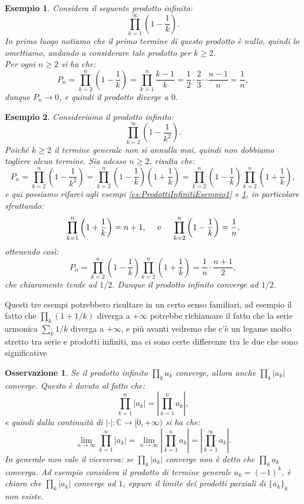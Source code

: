 \documentclass[11pt]{book}
\theoremstyle{Definizione}
\theoremstyle{TeoremaProposizioneLemmaCorollarioCongettura}
\theoremstyle{OsservazioneNotaEsempio}
\newtheorem{myobs}{Osservazione}[section]
\newtheorem{myes}{Esempio}[section]
\newcommand{\C}{\mathbb{C}}
\begin{document}
\begin{myes}\label{es:ProdottiInfinitiEsempio2}
Considera il seguente prodotto infinito:
$$
\prod_{k = 1}^\infty \left(1-\frac{1}{k}\right).
$$
In primo luogo notiamo che il primo termine di questo prodotto è nullo, quindi lo omettiamo, andando a considerare tale prodotto per $k\geq 2$.\\
Per ogni $n\geq 2$ si ha che:
$$
P_n = \prod_{k = 2}^n \left(1-\frac{1}{k}\right) = \prod_{k = 1}^n \frac{k-1}{k} = \frac{1}{2}\cdot \frac{2}{3}\cdots \frac{n-1}{n} = \frac{1}{n},
$$
dunque $P_n \to 0$, e quindi il prodotto diverge a $0$.
\end{myes}
\begin{myes}\label{es:ProdottiInfinitiEsempio3}
Consideriamo il prodotto infinito:
$$
\prod_{k = 2}^\infty \left(1-\frac{1}{k^2}\right).
$$
Poiché $k\geq 2$ il termine generale non si annulla mai, quindi non dobbiamo togliere alcun termine. Sia adesso $n\geq 2$, risulta che:
$$
P_n = \prod_{k = 2}^n \left(1-\frac{1}{k^2}\right) = \prod_{k = 2}^n \left(1-\frac{1}{k}\right)\left(1+\frac{1}{k}\right) = \prod_{k = 2}^n \left(1-\frac{1}{k}\right)\prod_{k = 2}^n\left(1+\frac{1}{k}\right),
$$
e qui possiamo rifarci agli esempi \ref{es:ProdottiInfinitiEsempio1} e \ref{es:ProdottiInfinitiEsempio2}, in particolare sfruttando:
$$
\prod_{k = 1}^n \left(1+\frac{1}{k}\right) = n+1,\quad \textup{ e }\quad \prod_{k = 2}^n \left(1-\frac{1}{k}\right) = \frac{1}{n},
$$
ottenendo così:
$$
P_n = \prod_{k = 2}^n \left(1-\frac{1}{k}\right)\prod_{k = 2}^n\left(1+\frac{1}{k}\right) = \frac{1}{n}\cdot \frac{n+1}{2},
$$
che chiaramente tende ad $1/2$. Dunque il prodotto infinito converge ad $1/2$.
\end{myes}
Questi tre esempi potrebbero risultare in un certo senso familiari, ad esempio il fatto che $\prod_k (1+1/k)$ diverga a $+\infty$ potrebbe richiamare il fatto che la serie armonica $\sum_k 1/k$ diverga a $+\infty$, e più avanti vedremo che c'è un legame molto stretto tra serie e prodotti infiniti, ma ci sono certe differenze tra le due che sono significative
\begin{myobs}
Se il prodotto infinito $\prod_k a_k$ converge, allora anche $\prod_k |a_k|$ converge. Questo è dovuto al fatto che:
$$
\prod_{k = 1}^n |a_k| = \left|\prod_{k = 1}^n a_k\right|,
$$
e quindi dalla continuità di $|\cdot|:\C \longrightarrow [0,+\infty)$ si ha che:
$$
\lim_{n\to\infty} \prod_{k = 1}^n |a_k| = \lim_{n\to\infty}\left|\prod_{k = 1}^n a_k\right| = \left|\prod_{k = 1}^\infty a_k\right|.
$$
In generale non vale il viceversa: se $\prod_k |a_k|$ converge non è detto che $\prod_k a_k$ converga. Ad esempio considera il prodotto di termine generale $a_k = (-1)^k$, è chiaro che $\prod_k |a_k|$ converge ad $1$, eppure il limite dei prodotti parziali di $\{a_k\}_k$ non esiste.
\end{myobs}
\end{document}
